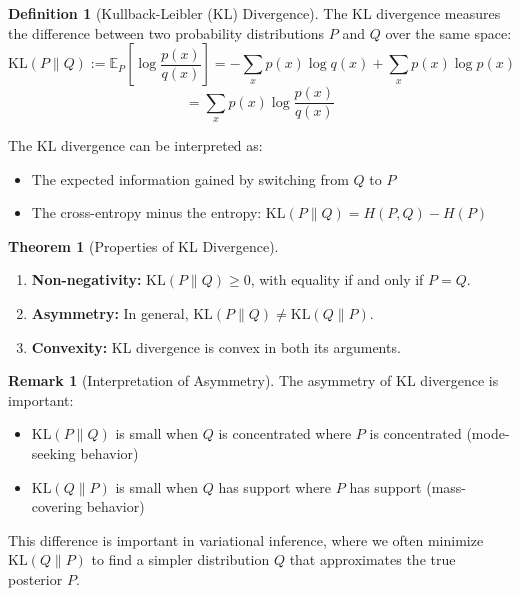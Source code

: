 \documentclass[12pt,a4paper]{article}
\theoremstyle{definition}
\newtheorem{definition}{Definition}[section]
\newtheorem{theorem}{Theorem}[section]
\newtheorem{remark}{Remark}[section]
\begin{document}
\begin{definition}[Kullback-Leibler (KL) Divergence]
The KL divergence measures the difference between two probability distributions $P$ and $Q$ over the same space:
\[
\text{KL}(P \| Q) := \mathbb{E}_P\left[\log \frac{p(x)}{q(x)}\right] = -\sum_x p(x) \log q(x) + \sum_x p(x) \log p(x)
\]
\[
= \sum_x p(x) \log \frac{p(x)}{q(x)}
\]

The KL divergence can be interpreted as:
\begin{itemize}
    \item The expected information gained by switching from $Q$ to $P$
    \item The cross-entropy minus the entropy: $\text{KL}(P \| Q) = H(P, Q) - H(P)$
\end{itemize}
\end{definition}

\begin{theorem}[Properties of KL Divergence]
\begin{enumerate}
    \item \textbf{Non-negativity:} $\text{KL}(P \| Q) \geq 0$, with equality if and only if $P = Q$.
    
    \item \textbf{Asymmetry:} In general, $\text{KL}(P \| Q) \neq \text{KL}(Q \| P)$.
    
    \item \textbf{Convexity:} KL divergence is convex in both its arguments.
\end{enumerate}
\end{theorem}

\begin{remark}[Interpretation of Asymmetry]
The asymmetry of KL divergence is important:
\begin{itemize}
    \item $\text{KL}(P \| Q)$ is small when $Q$ is concentrated where $P$ is concentrated (mode-seeking behavior)
    \item $\text{KL}(Q \| P)$ is small when $Q$ has support where $P$ has support (mass-covering behavior)
\end{itemize}

This difference is important in variational inference, where we often minimize $\text{KL}(Q \| P)$ to find a simpler distribution $Q$ that approximates the true posterior $P$.
\end{remark}

\newpage

\end{document}

